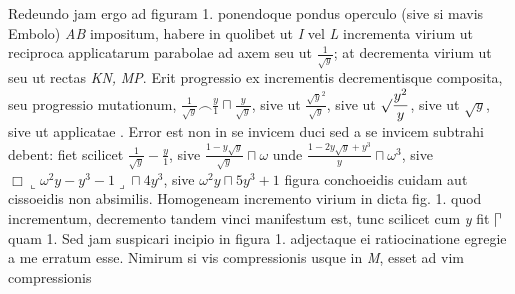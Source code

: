 
\pstart \footnotesize Redeundo jam ergo ad figuram 1. ponendoque pondus operculo (sive si mavis Embolo) \textit{AB} impositum, habere in quolibet  ut \textit{I} vel \textit{L} incrementa virium\protect{} ut reciproca applicatarum parabolae ad axem seu ut $\displaystyle \frac{1}{\surd y}$; at decrementa virium ut  seu ut rectas \textit{KN,} \textit{MP}. Erit progressio ex incrementis decrementisque composita, seu progressio mutationum,  $\displaystyle \frac{1}{\surd y}\smallfrown\frac{y}{1}\sqcap\frac{y}{\surd y}$, sive ut $\displaystyle\frac{\surd y^2}{\surd y}$, sive ut $\displaystyle\surd\frac{y^2}{y}$, sive ut $\displaystyle\surd y$, sive ut applicatae . Error est non in se invicem duci sed a se invicem subtrahi debent: fiet scilicet $\displaystyle \frac{1}{\surd y}-\frac{y}{1}$, sive $\displaystyle\frac{1-y\surd y}{\surd y}\sqcap \omega$ unde $\displaystyle \frac{1-2y\surd y+y^3}{y}\sqcap \omega^3$, sive $\displaystyle\Box \llcorner \omega^2y-y^3-1\lrcorner \sqcap 4y^3$, sive $\displaystyle \omega^2y\sqcap 5y^3+1$ figura conchoeidis cuidam aut cissoeidis  non absimilis. Homogeneam incremento virium\protect{} in 
                        dicta fig. 1. quod incrementum, decremento tandem vinci manifestum est, tunc scilicet cum \textit{y} fit $\raisebox{0.8pt}{$\urcorner$} \hspace{-5.5pt}|\hspace{3pt}$ quam 1. Sed jam suspicari incipio in figura 1. adjectaque ei ratiocinatione egregie a me erratum esse. Nimirum si vis compressionis\protect{} usque in \textit{M}, esset ad vim compressionis\protect{} 
